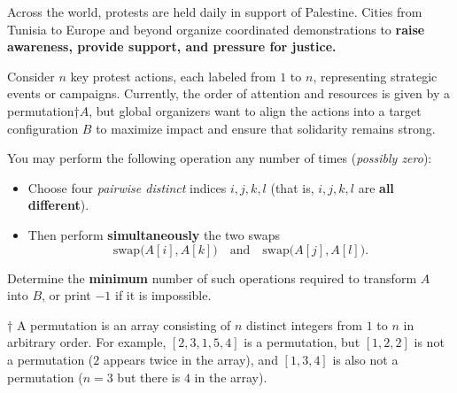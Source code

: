 Across the world, protests are held daily in support of Palestine. Cities from Tunisia to Europe and beyond organize coordinated demonstrations to \textbf{raise awareness, provide support, and pressure for justice.}

Consider $n$ key protest actions, each labeled from $1$ to $n$, representing strategic events or campaigns. Currently, the order of attention and resources is given by a permutation†$A$, but global organizers want to align the actions into a target configuration $B$ to maximize impact and ensure that solidarity remains strong.

You may perform the following operation any number of times (\emph{possibly zero}):

\begin{itemize}
  \item Choose four \emph{pairwise distinct} indices $i,j,k,l$ (that is, $i,j,k,l$ are \textbf{all different}).
  \item Then perform \textbf{simultaneously} the two swaps
    $$\text{swap}\bigl(A[i],A[k]\bigr)\quad\text{and}\quad \text{swap}\bigl(A[j],A[l]\bigr).$$
\end{itemize}

Determine the \textbf{minimum} number of such operations required to transform $A$ into $B$, or print $-1$ if it is impossible.

†
 A permutation is an array consisting of $n$ distinct integers from $1$ to $n$ in arbitrary order. For example, $[2,3,1,5,4]$ is a permutation, but $[1,2,2]$ is not a permutation ($2$ appears twice in the array), and $[1,3,4]$ is also not a permutation ($n=3$ but there is $4$ in the array).